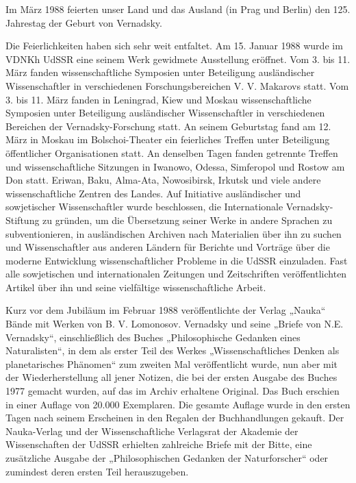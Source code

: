 \documentclass[11pt,a4paper]{article}
\begin{document}
Im März 1988 feierten unser Land und das Ausland (in Prag und Berlin) den
125. Jahrestag der Geburt von Vernadsky.

Die Feierlichkeiten haben sich sehr weit entfaltet. Am 15. Januar 1988 wurde
im VDNKh UdSSR eine seinem Werk gewidmete Ausstellung eröffnet. Vom 3. bis
11. März fanden wissenschaftliche Symposien unter Beteiligung ausländischer
Wissenschaftler in verschiedenen Forschungsbereichen V. V. Makarovs statt. Vom
3. bis 11. März fanden in Leningrad, Kiew und Moskau wissenschaftliche
Symposien unter Beteiligung ausländischer Wissenschaftler in verschiedenen
Bereichen der Vernadsky-Forschung statt. An seinem Geburtstag fand am 12. März
in Moskau im Bolschoi-Theater ein feierliches Treffen unter Beteiligung
öffentlicher Organisationen statt. An denselben Tagen fanden getrennte Treffen
und wissenschaftliche Sitzungen in Iwanowo, Odessa, Simferopol und Rostow am
Don statt. Eriwan, Baku, Alma-Ata, Nowosibirsk, Irkutsk und viele andere
wissenschaftliche Zentren des Landes. Auf Initiative ausländischer und
sowjetischer Wissenschaftler wurde beschlossen, die Internationale
Vernadsky-Stiftung zu gründen, um die Übersetzung seiner Werke in andere
Sprachen zu subventionieren, in ausländischen Archiven nach Materialien über
ihn zu suchen und Wissenschaftler aus anderen Ländern für Berichte und
Vorträge über die moderne Entwicklung wissenschaftlicher Probleme in die UdSSR
einzuladen. Fast alle sowjetischen und internationalen Zeitungen und
Zeitschriften veröffentlichten Artikel über ihn und seine vielfältige
wissenschaftliche Arbeit.

Kurz vor dem Jubiläum im Februar 1988 veröffentlichte der Verlag „Nauka“
Bände mit Werken von B. V. Lomonosov. Vernadsky und seine „Briefe von
N.E. Vernadsky“, einschließlich des Buches „Philosophische Gedanken eines
Naturalisten“, in dem als erster Teil des Werkes „Wissenschaftliches Denken
als planetarisches Phänomen“ zum zweiten Mal veröffentlicht wurde, nun aber
mit der Wiederherstellung all jener Notizen, die bei der ersten Ausgabe des
Buches 1977 gemacht wurden, auf das im Archiv erhaltene Original. Das Buch
erschien in einer Auflage von 20.000 Exemplaren. Die gesamte Auflage wurde in
den ersten Tagen nach seinem Erscheinen in den Regalen der Buchhandlungen
gekauft. Der Nauka-Verlag und der Wissenschaftliche Verlagsrat der Akademie
der Wissenschaften der UdSSR erhielten zahlreiche Briefe mit der Bitte, eine
zusätzliche Ausgabe der „Philosophischen Gedanken der Naturforscher“ oder
zumindest deren ersten Teil herauszugeben.
\end{document}

